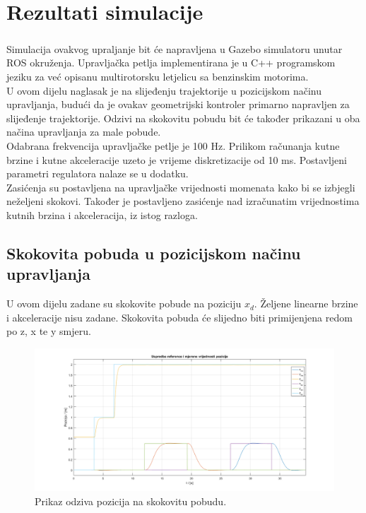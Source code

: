 \documentclass[times, utf8, diplomski, numeric]{fer}
\begin{document}
\chapter{Rezultati simulacije}

	\paragraph{}Simulacija ovakvog upraljanje bit će napravljena u Gazebo simulatoru unutar ROS okruženja. Upravljačka petlja implementirana je u C++ programskom jeziku za već opisanu multirotorsku letjelicu sa benzinskim motorima. \\
	U ovom dijelu naglasak je na slijeđenju trajektorije u pozicijskom načinu upravljanja, budući da je ovakav geometrijski kontroler primarno napravljen za slijeđenje trajektorije. Odzivi na skokovitu pobudu bit će također prikazani u oba načina upravljanja za male pobude. \\
	Odabrana frekvencija upravljačke petlje je 100 Hz. Prilikom računanja kutne brzine i kutne akceleracije uzeto je vrijeme diskretizacije od 10 ms. Postavljeni parametri regulatora nalaze se u dodatku. \\
	Zasićenja su postavljena na upravljačke vrijednosti momenata kako bi se izbjegli neželjeni skokovi. Također je postavljeno zasićenje nad izračunatim vrijednostima kutnih brzina i akceleracija, iz istog razloga.
	
	\section{Skokovita pobuda u pozicijskom načinu upravljanja}
	U ovom dijelu zadane su skokovite pobude na poziciju $x_d$. Željene linearne brzine i akceleracije nisu zadane. Skokovita pobuda će slijedno biti primijenjena redom po z, x te y smjeru.
	
	\begin{figure}[h!]
		\includegraphics[width=\textwidth]{plots/pos_pos2.png}
		\caption{Prikaz odziva pozicija na skokovitu pobudu.}
	\end{figure}
	
\end{document}
